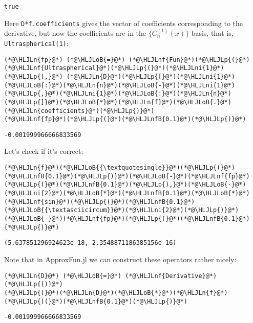 \documentclass[12pt,a4paper]{article}
\newcommand{\HLJLn}[1]{#1}
\newcommand{\HLJLnf}[1]{\textcolor[RGB]{66,102,213}{#1}}
\newcommand{\HLJLnfB}[1]{\textcolor[RGB]{59,151,46}{#1}}
\newcommand{\HLJLni}[1]{\textcolor[RGB]{59,151,46}{#1}}
\newcommand{\HLJLoB}[1]{\textcolor[RGB]{102,102,102}{\textbf{#1}}}
\newcommand{\HLJLp}[1]{#1}
\begin{document}
\begin{lstlisting}
true
\end{lstlisting}


Here \texttt{D*f.coefficients} gives the vector of coefficients corresponding to the derivative, but now the coefficients are in the $\lbrace C_n^{(1)}(x)\rbrace$ basis, that is, \texttt{Ultraspherical(1)}:


\begin{lstlisting}
(*@\HLJLn{fp}@*) (*@\HLJLoB{=}@*) (*@\HLJLnf{Fun}@*)(*@\HLJLp{(}@*)(*@\HLJLnf{Ultraspherical}@*)(*@\HLJLp{(}@*)(*@\HLJLni{1}@*)(*@\HLJLp{),}@*) (*@\HLJLn{D}@*)(*@\HLJLp{[}@*)(*@\HLJLni{1}@*)(*@\HLJLoB{:}@*)(*@\HLJLn{n}@*)(*@\HLJLoB{-}@*)(*@\HLJLni{1}@*)(*@\HLJLp{,}@*)(*@\HLJLni{1}@*)(*@\HLJLoB{:}@*)(*@\HLJLn{n}@*)(*@\HLJLp{]}@*)(*@\HLJLoB{*}@*)(*@\HLJLn{f}@*)(*@\HLJLoB{.}@*)(*@\HLJLn{coefficients}@*)(*@\HLJLp{)}@*)
(*@\HLJLnf{fp}@*)(*@\HLJLp{(}@*)(*@\HLJLnfB{0.1}@*)(*@\HLJLp{)}@*)
\end{lstlisting}

\begin{lstlisting}
-0.001999966666833569
\end{lstlisting}


Let's check if it's correct:


\begin{lstlisting}
(*@\HLJLn{f}@*)(*@\HLJLoB{{\textquotesingle}}@*)(*@\HLJLp{(}@*)(*@\HLJLnfB{0.1}@*)(*@\HLJLp{)}@*)(*@\HLJLoB{-}@*)(*@\HLJLnf{fp}@*)(*@\HLJLp{(}@*)(*@\HLJLnfB{0.1}@*)(*@\HLJLp{),}@*)(*@\HLJLoB{-}@*)(*@\HLJLni{2}@*)(*@\HLJLoB{*}@*)(*@\HLJLnfB{0.1}@*)(*@\HLJLoB{*}@*)(*@\HLJLnf{sin}@*)(*@\HLJLp{(}@*)(*@\HLJLnfB{0.1}@*)(*@\HLJLoB{{\textasciicircum}}@*)(*@\HLJLni{2}@*)(*@\HLJLp{)}@*)(*@\HLJLoB{-}@*)(*@\HLJLnf{fp}@*)(*@\HLJLp{(}@*)(*@\HLJLnfB{0.1}@*)(*@\HLJLp{)}@*)
\end{lstlisting}

\begin{lstlisting}
(5.637851296924623e-18, 2.3548871186385156e-16)
\end{lstlisting}


Note that in ApproxFun.jl we can construct these operators rather nicely:


\begin{lstlisting}
(*@\HLJLn{D}@*) (*@\HLJLoB{=}@*) (*@\HLJLnf{Derivative}@*)(*@\HLJLp{()}@*)
(*@\HLJLp{(}@*)(*@\HLJLn{D}@*)(*@\HLJLoB{*}@*)(*@\HLJLn{f}@*)(*@\HLJLp{)(}@*)(*@\HLJLnfB{0.1}@*)(*@\HLJLp{)}@*)
\end{lstlisting}

\begin{lstlisting}
-0.001999966666833569
\end{lstlisting}
\end{document}
